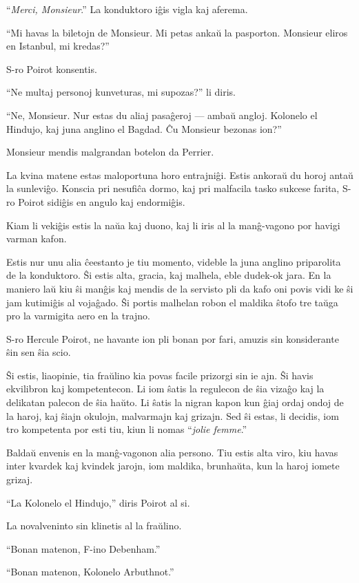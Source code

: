 ``\emph{Merci, Monsieur}.'' La konduktoro iĝis vigla kaj aferema.

``Mi havas la biletojn de Monsieur. Mi petas ankaŭ la pasporton. Monsieur eliros en Istanbul, mi kredas?''

S-ro Poirot konsentis.

``Ne multaj personoj kunveturas, mi supozas?'' li diris.

``Ne, Monsieur. Nur estas du aliaj pasaĝeroj --- ambaŭ angloj. Kolonelo el Hindujo, kaj juna anglino el Bagdad. Ĉu Monsieur bezonas ion?''

Monsieur mendis malgrandan botelon da Perrier.

La kvina matene estas maloportuna horo entrajniĝi. Estis ankoraŭ du horoj antaŭ la sunleviĝo. Konscia pri nesufiĉa dormo, kaj pri malfacila tasko sukcese farita, S-ro Poirot sidiĝis en angulo kaj endormiĝis.

\sectionbreak

Kiam li vekiĝis estis la naŭa kaj duono, kaj li iris al la manĝ-vagono por havigi varman kafon.

Estis nur unu alia ĉeestanto je tiu momento, videble la juna anglino priparolita de la konduktoro. Ŝi estis alta, gracia, kaj malhela, eble dudek-ok jara. En la maniero laŭ kiu ŝi manĝis kaj mendis de la servisto pli da kafo oni povis vidi ke ŝi jam kutimiĝis al vojaĝado. Ŝi portis malhelan robon el maldika ŝtofo tre taŭga pro la varmigita aero en la trajno.

S-ro Hercule Poirot, ne havante ion pli bonan por fari, amuzis sin konsiderante ŝin sen ŝia scio.

Ŝi estis, liaopinie, tia fraŭlino kia povas facile prizorgi sin ie ajn. Ŝi havis ekvilibron kaj kompetentecon. Li iom ŝatis la regulecon de ŝia vizaĝo kaj la delikatan palecon de ŝia haŭto. Li ŝatis la nigran kapon kun ĝiaj ordaj ondoj de la haroj, kaj ŝiajn okulojn, malvarmajn kaj grizajn. Sed ŝi estas, li decidis, iom tro kompetenta por esti tiu, kiun li nomas ``\emph{jolie femme}.''

Baldaŭ envenis en la manĝ-vagonon alia persono. Tiu estis alta viro, kiu havas inter kvardek kaj kvindek jarojn, iom maldika, brunhaŭta, kun la haroj iomete grizaj.

``La Kolonelo el Hindujo,'' diris Poirot al si.

La novalveninto sin klinetis al la fraŭlino.

``Bonan matenon, F-ino Debenham.''

``Bonan matenon, Kolonelo Arbuthnot.''

